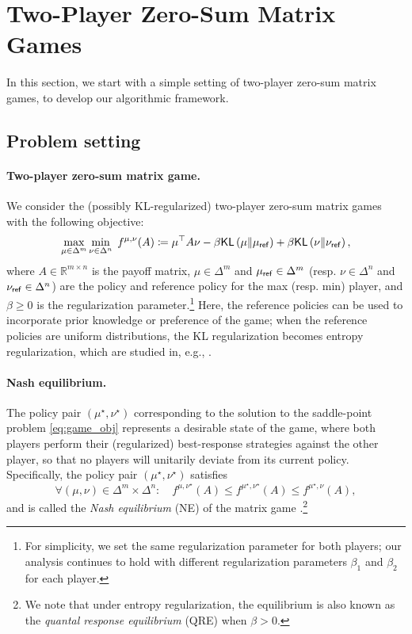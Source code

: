 
\section{Two-Player Zero-Sum Matrix Games}
\label{sec:matrix_game}

In this section, we start with a simple setting of two-player zero-sum matrix games, to develop our algorithmic framework.

\subsection{Problem setting}\label{sec:matrix_setting}


\paragraph{Two-player zero-sum matrix game.} 
We consider the (possibly KL-regularized) two-player zero-sum matrix games with the following objective:
\begin{align}\label{eq:game_obj}
    \max_{\mu\in\Delta^m} \min_{\nu\in\Delta^{n}} \; f^{\mu,\nu}(A)\coloneqq\mu^\top A \nu - \beta\mathsf{KL}\left(\mu\|\mu_{\mathsf{ref}}\right) + \beta\mathsf{KL}\left(\nu\|\nu_{\mathsf{ref}}\right),
\end{align}
where $A\in\mathbb{R}^{m\times n}$ is the payoff matrix, $\mu\in\Delta^m$ and $\mu_{\mathsf{ref}}\in\Delta^m$ (resp. $\nu\in\Delta^n$ and $\nu_{\mathsf{ref}}\in\Delta^n$) are the policy and reference policy for the max (resp. min) player, and $\beta\geq 0$ is the regularization parameter.\footnote{For simplicity, we set the same regularization parameter for both players; our analysis continues to hold with different regularization parameters $\beta_1$ and $\beta_2$ for each player.} Here, the reference policies can be used to incorporate prior knowledge or preference of the game; when the reference policies are uniform distributions, the KL regularization becomes entropy regularization, which are studied in, e.g., \citet{cen2021fast}.

 
\paragraph{Nash equilibrium.} The policy pair $(\mu^\star,\nu^\star)$ corresponding to the solution to the saddle-point problem \eqref{eq:game_obj} represents a desirable state of the game, where both players perform their (regularized) best-response strategies against  the other player, so that no players will unitarily deviate from its current policy. Specifically,  the policy pair $(\mu^\star,\nu^\star)$ satisfies
$$\forall (\mu,\nu)\in\Delta^m\times\Delta^n:\quad f^{\mu,\nu^\star}(A)\leq f^{\mu^\star,\nu^\star}(A)\leq f^{\mu^\star,\nu}(A), $$
and is called the {\em Nash equilibrium} (NE) of the matrix game \citep{nash1950non}.\footnote{We note that under entropy regularization, the equilibrium is also known as the {\em quantal response equilibrium} (QRE) \citep{mckelvey1995quantal} when $\beta>0$.}

